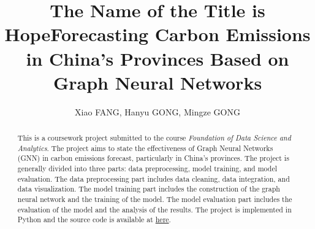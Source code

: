 \documentclass[sigconf, authordraft]{acmart}
\begin{document}
	\title{The Name of the Title is Hope}
	\title{Forecasting Carbon Emissions in China's Provinces Based on Graph Neural Networks}



	\author{Xiao FANG, Hanyu GONG, Mingze GONG}


	\renewcommand{\shortauthors}{Xiao, Hanyu \& Mingze}


	\begin{abstract}
		This is a coursework project submitted to the course \textit{Foundation of Data
		Science and Analytics}. The project aims to state the effectiveness of Graph
		Neural Networks (GNN) in carbon emissions forecast, particularly in China's
		provinces. The project is generally divided into three parts: data
		preprocessing, model training, and model evaluation. The data preprocessing part
		includes data cleaning, data integration, and data visualization. The model
		training part includes the construction of the graph neural network and the
		training of the model. The model evaluation part includes the evaluation of the
		model and the analysis of the results. The project is implemented in Python
		and the source code is available at
		\href{https://github.com/palaceparis/DSAA5020_Group_Project}{here}.
	\end{abstract}


\end{document}
